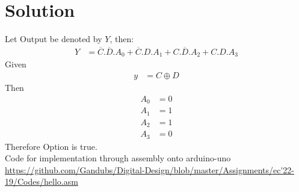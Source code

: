 \documentclass[journal,12pt,onecolumn]{IEEEtran}
\theoremstyle{remark}
\begin{document}
\section{Solution}
Let Output be denoted by $Y$, then:
\begin{align}
    Y &= \overline{C}.\overline{D}.A_{0} + \overline{C}.D.A_{1} + C.\overline{D}.A_{2} + C.D.A_{3}
\end{align}
Given \begin{align}
    y &= C\oplus D
\end{align}
Then
\begin{align}
    A_0&=0\\
    A_1&=1\\
    A_2&=1\\
    A_3&=0
\end{align}
Therefore Option  is true.\\
Code for implementation through assembly onto arduino-uno\\
\url{https://github.com/Gandubs/Digital-Design/blob/master/Assignments/ec'22-19/Codes/hello.asm}
 
\end{document}

